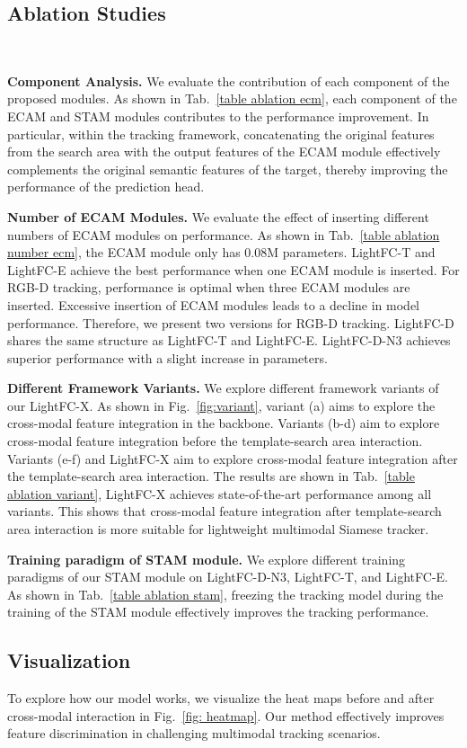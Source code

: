 \subsection{Ablation Studies}

\ 

\textbf{Component Analysis.} We evaluate the contribution of each component of the proposed modules. As shown in Tab.~\ref{table ablation ecm}, each component of the ECAM and STAM modules contributes to the performance improvement. In particular, within the tracking framework, concatenating the original features from the search area with the output features of the ECAM module effectively complements the original semantic features of the target, thereby improving the performance of the prediction head.

\textbf{Number of ECAM Modules.} We evaluate the effect of inserting different numbers of ECAM modules on performance. As shown in Tab.~\ref{table ablation number ecm}, the ECAM module only has 0.08M parameters. LightFC-T and LightFC-E achieve the best performance when one ECAM module is inserted. For RGB-D tracking, performance is optimal when three ECAM modules are inserted. Excessive insertion of ECAM modules leads to a decline in model performance. Therefore, we present two versions for RGB-D tracking. LightFC-D shares the same structure as LightFC-T and LightFC-E. LightFC-D-N3 achieves superior performance with a slight increase in parameters.








\textbf{Different Framework Variants.} We explore different framework variants of our LightFC-X. As shown in Fig.~\ref{fig:variant},  variant (a) aims to explore the cross-modal feature integration in the backbone. Variants (b-d) aim to explore cross-modal feature integration before the template-search area interaction. Variants (e-f) and LightFC-X aim to explore cross-modal feature integration after the template-search area interaction. The results are shown in Tab.~\ref{table ablation variant}, LightFC-X achieves state-of-the-art performance among all variants. This shows that cross-modal feature integration after template-search area interaction is more suitable for lightweight multimodal Siamese tracker.



\textbf{Training paradigm of STAM module.} We explore different training paradigms of our STAM module on LightFC-D-N3, LightFC-T, and LightFC-E. As shown in Tab.~\ref{table ablation stam}, freezing the tracking model during the training of the STAM module effectively improves the tracking performance.



\subsection{Visualization}

 To explore how our model works, we visualize the heat maps before and after cross-modal interaction in Fig.~\ref{fig: heatmap}. Our method effectively improves feature discrimination in challenging multimodal tracking scenarios.
